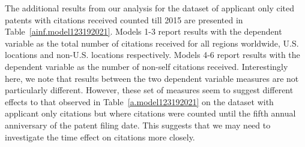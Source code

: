 \documentclass[12pt,letterpaper]{article}
\begin{document}



The additional results from our analysis for the dataset of applicant only cited patents with citations received counted till 2015 are presented in Table~\ref{ainf.model123192021}. Models 1-3 report results with the dependent variable as the total number of citations received for all regions worldwide, U.S. locations and non-U.S. locations respectively. Models 4-6 report results with the dependent variable as the number of non-self citations received. Interestingly here, we note that results between the two dependent variable measures are not particularly different. However, these set of measures seem to suggest different effects to that observed in Table~\ref{a.model123192021} on the dataset with applicant only citations but where citations were counted until the fifth annual anniversary of the patent filing date. This suggests that we may need to investigate the time effect on citations more closely. \par
\end{document}
